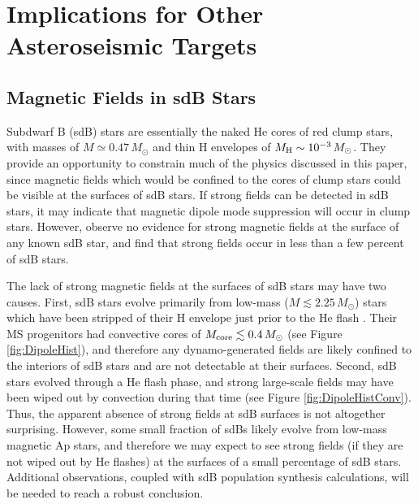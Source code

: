 \section{Implications for Other Asteroseismic Targets}
\label{pulsators}

\subsection{Magnetic Fields in sdB Stars}

Subdwarf B (sdB) stars are essentially the naked He cores of red clump stars, with masses of $M \simeq 0.47 \, M_\odot$ \citep{fontaine_2012} and thin H envelopes of $M_{\rm H} \sim 10^{-3} \, M_\odot$. They provide an opportunity to constrain much of the physics discussed in this paper, since magnetic fields which would be confined to the cores of clump stars could be visible at the surfaces of sdB stars. If strong fields can be detected in sdB stars, it may indicate that magnetic dipole mode suppression will occur in clump stars. However, \cite{Landstreet_2012} observe no evidence for strong magnetic fields at the surface of any known sdB star, and find that strong fields occur in less than a few percent of sdB stars. 

The lack of strong magnetic fields at the surfaces of sdB stars may have two causes. First, sdB stars evolve primarily from low-mass ($M \lesssim 2.25 \, M_\odot$) stars which have been stripped of their H envelope just prior to the He flash \citep{heber_2009}. Their MS progenitors had convective cores of $M_{\rm core} \lesssim 0.4 \, M_\odot$ (see Figure \ref{fig:DipoleHist}), and therefore any dynamo-generated fields are likely confined to the interiors of sdB stars and are not detectable at their surfaces. Second, sdB stars evolved through a He flash phase, and strong large-scale fields may have been wiped out by convection during that time (see Figure \ref{fig:DipoleHistConv}). Thus, the apparent absence of strong fields at sdB surfaces is not altogether surprising. However, some small fraction of sdBs likely evolve from low-mass magnetic Ap stars, and therefore we may expect to see strong fields (if they are not wiped out by He flashes) at the surfaces of a small percentage of sdB stars. Additional observations, coupled with sdB population synthesis calculations, will be needed to reach a robust conclusion.

